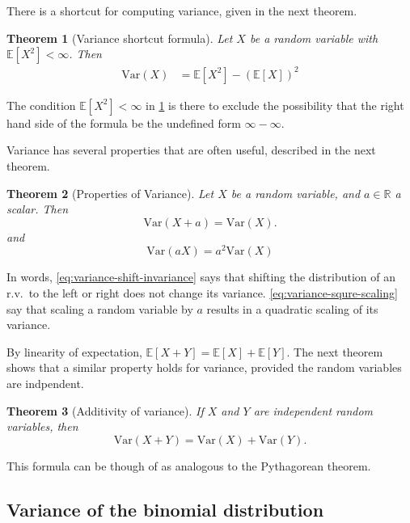 \documentclass[10pt]{article}
\newtheorem{theorem}{Theorem}
\theoremstyle{definition}
\newcommand{\1}[1]{\textbf{1}_{\left[#1\right]}} %
\def\R{\mathbb{R}} %
\def\E{\mathbb{E}} %
\def\Var{\mathrm{Var}} %
\begin{document}
There is a shortcut for computing variance, given in the next theorem.
\begin{theorem}[Variance shortcut formula]
  \label{thm:variance-shortcut-formula}
  Let $X$ be a random variable with $\E\left[X^{2} \right]<\infty$. Then
  \begin{align*}
    \Var(X) 
    &= \E\left[X^{2} \right] - \left( \E\left[X \right] \right)^{2}
  \end{align*}
\end{theorem}
The condition $\E\left[X^{2} \right]<\infty$ in
\cref{thm:variance-shortcut-formula} is there to exclude the possibility that
the right hand side of the formula be the undefined form $\infty-\infty$.



Variance has several properties that are often useful, described in the next
theorem.

\begin{theorem}[Properties of Variance]
  \label{thm:variance-properties}
  Let $X$ be a random variable, and $a\in \R$ a scalar. Then
  \begin{equation}\label{eq:variance-shift-invariance}
    \Var(X+a) = \Var(X).
  \end{equation}
  and
  \begin{equation}\label{eq:variance-squre-scaling}
    \Var(aX) = a^{2}\Var(X)
  \end{equation}
\end{theorem}
In words, \cref{eq:variance-shift-invariance} says that shifting the
distribution of an r.v.~to the left or right does not change its variance.
\cref{eq:variance-squre-scaling} say that scaling a random variable by $a$
results in a quadratic scaling of its variance.

By linearity of expectation, $\E[X+Y]= \E[X]+\E[Y]$. The next theorem shows
that a similar property holds for variance, provided the random variables are
indpendent.
\begin{theorem}[Additivity of variance]
  \label{thm:additivity-variance}
  If $X$ and $Y$ are independent random variables, then
  \begin{equation}\label{eq:additivity-of-variance}
    \Var(X+Y) = \Var(X)+\Var(Y).
  \end{equation}
\end{theorem}
This formula can be though of as analogous to the Pythagorean theorem.

\subsection{Variance of the binomial distribution}
\end{document}
